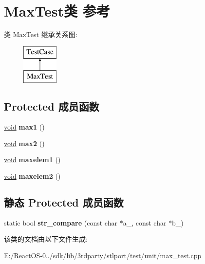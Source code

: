 \hypertarget{class_max_test}{}\section{Max\+Test类 参考}
\label{class_max_test}
类 Max\+Test 继承关系图\+:\begin{figure}[H]
\begin{center}
\leavevmode
\includegraphics[height=2.000000cm]{class_max_test}
\end{center}
\end{figure}
\subsection*{Protected 成员函数}
\begin{DoxyCompactItemize}
\item 
\mbox{\label{class_max_test_a3b401b55bab6a9498e3377dad9b950d9}} 
\hyperlink{interfacevoid}{void} {\bfseries max1} ()
\item 
\mbox{\label{class_max_test_a9ea533b376676b1b2853d2ffd5c526eb}} 
\hyperlink{interfacevoid}{void} {\bfseries max2} ()
\item 
\mbox{\label{class_max_test_a7895d2f76192ab25eb98e834c1b6c97d}} 
\hyperlink{interfacevoid}{void} {\bfseries maxelem1} ()
\item 
\mbox{\label{class_max_test_ad6af27fb7a4136df07fe6a38934da427}} 
\hyperlink{interfacevoid}{void} {\bfseries maxelem2} ()
\end{DoxyCompactItemize}
\subsection*{静态 Protected 成员函数}
\begin{DoxyCompactItemize}
\item 
\mbox{\label{class_max_test_a36f918976d1b2291e0fd4995f2488457}} 
static bool {\bfseries str\+\_\+compare} (const char $\ast$a\+\_\+, const char $\ast$b\+\_\+)
\end{DoxyCompactItemize}


该类的文档由以下文件生成\+:\begin{DoxyCompactItemize}
\item 
E\+:/\+React\+O\+S-\/0../sdk/lib/3rdparty/stlport/test/unit/max\+\_\+test.\+cpp\end{DoxyCompactItemize}
